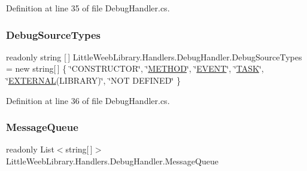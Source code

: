 Definition at line 35 of file Debug\+Handler.\+cs.

\mbox{\label{class_little_weeb_library_1_1_handlers_1_1_debug_handler_a6073413df4c401fb94a64ee2a0649293}} 
\subsubsection{\texorpdfstring{Debug\+Source\+Types}{DebugSourceTypes}}
{\footnotesize\ttfamily readonly string \mbox{[}$\,$\mbox{]} Little\+Weeb\+Library.\+Handlers.\+Debug\+Handler.\+Debug\+Source\+Types = new string\mbox{[}$\,$\mbox{]} \{ \char`\"{}C\+O\+N\+S\+T\+R\+U\+C\+T\+OR\char`\"{}, \char`\"{}\mbox{\hyperlink{namespace_little_weeb_library_1_1_handlers_a2a6ca0775121c9c503d58aa254d292bea725e74fd6435d86483781e2bd8e9d2c7}{M\+E\+T\+H\+OD}}\char`\"{}, \char`\"{}\mbox{\hyperlink{namespace_little_weeb_library_1_1_handlers_a2a6ca0775121c9c503d58aa254d292bea030d962d0faa148f02848881a3b4fdb6}{E\+V\+E\+NT}}\char`\"{}, \char`\"{}\mbox{\hyperlink{namespace_little_weeb_library_1_1_handlers_a2a6ca0775121c9c503d58aa254d292bea0ed9b001ca1cd2667302a9be876ede9d}{T\+A\+SK}}\char`\"{}, \char`\"{}\mbox{\hyperlink{namespace_little_weeb_library_1_1_handlers_a2a6ca0775121c9c503d58aa254d292bea3932d629fb5e2be9d09b3a4485b3cc9d}{E\+X\+T\+E\+R\+N\+AL}}(L\+I\+B\+R\+A\+RY)\char`\"{}, \char`\"{}N\+OT D\+E\+F\+I\+N\+ED\char`\"{} \}\hspace{0.3cm}{\ttfamily [private]}}



Definition at line 36 of file Debug\+Handler.\+cs.

\mbox{\label{class_little_weeb_library_1_1_handlers_1_1_debug_handler_af4dc20fe66b515bdd875bb4b1124cb2a}} 
\subsubsection{\texorpdfstring{Message\+Queue}{MessageQueue}}
{\footnotesize\ttfamily readonly List$<$string\mbox{[}$\,$\mbox{]}$>$ Little\+Weeb\+Library.\+Handlers.\+Debug\+Handler.\+Message\+Queue\hspace{0.3cm}{\ttfamily [private]}}



